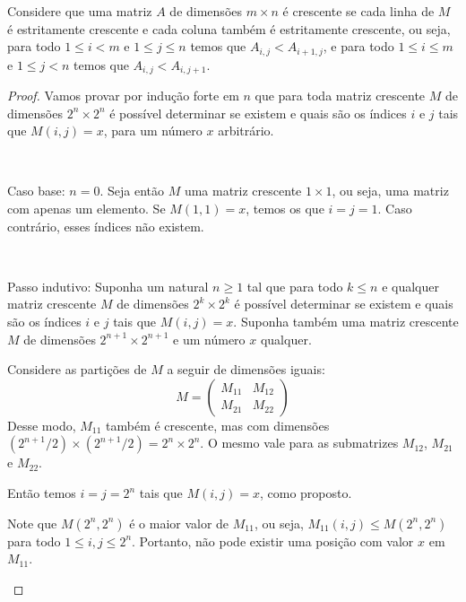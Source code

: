Considere que uma matriz $A$ de dimensões $m \times n$ é crescente se cada linha de $M$ é estritamente crescente e cada coluna também é estritamente crescente, ou seja, para todo $1 \leq i < m$ e $1 \leq j \leq n$ temos que $A_{i,j} < A_{i+1,j}$, e para todo $1 \leq i \leq m$ e $1 \leq j < n$ temos que $A_{i,j} < A_{i,j+1}$.

\itemsep

\begin{proof}
    Vamos provar por indução forte em $n$ que para toda matriz crescente $M$ de dimensões $2^n \times 2^n$ é possível determinar se existem e quais são os índices $i$ e $j$ tais que $M(i,j) = x$, para um número $x$ arbitrário.

    ~

    Caso base: $n = 0$. Seja então $M$ uma matriz crescente $1 \times 1$, ou seja, uma matriz com apenas um elemento. Se $M(1,1) = x$, temos os que $i = j = 1$. Caso contrário, esses índices não existem.

    ~

    Passo indutivo: Suponha um natural $n \geq 1$ tal que para todo $k \leq n$ e qualquer matriz crescente $M$ de dimensões $2^k \times 2^k$ é possível determinar se existem e quais são os índices $i$ e $j$ tais que $M(i,j) = x$. Suponha também uma matriz crescente $M$ de dimensões $2^{n+1} \times 2^{n+1}$ e um número $x$ qualquer.

    Considere as partições de $M$ a seguir de dimensões iguais:
    \[
        M = \begin{pmatrix}
            M_{11} & M_{12} \\
            M_{21} & M_{22}
        \end{pmatrix}
    \]
    Desse modo, $M_{11}$ também é crescente, mas com dimensões \\ $\left(2^{n+1}/2\right) \times \left(2^{n+1}/2\right) = 2^n \times 2^n$. O mesmo vale para as submatrizes $M_{12}$, $M_{21}$ e $M_{22}$.

    \begin{case}[$M\left(2^n, 2^n\right) = x$]
        Então temos $i = j = 2^n$ tais que $M(i, j) = x$, como proposto.
    \end{case}
    \begin{case}
        Note que $M\left(2^n, 2^n\right)$ é o maior valor de $M_{11}$, ou seja, $M_{11}(i, j) \leq M\left(2^n, 2^n\right)$ para todo $1 \leq i, j \leq 2^n$. Portanto, não pode existir uma posição com valor $x$ em $M_{11}$.


\end{case}
\end{proof}
